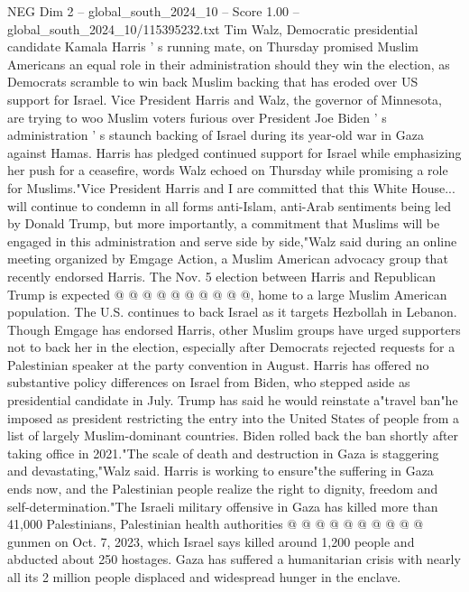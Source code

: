 \begin{textsample}{NEG Dim 2 – global\_south\_2024\_10 – Score 1.00 – global\_south\_2024\_10/115395232.txt}  \label{ex:f2_neg_416}
Tim Walz, Democratic presidential candidate Kamala Harris ' s running mate, on Thursday promised Muslim Americans an equal role in their administration should they win the election, as Democrats scramble to win back Muslim backing that has eroded over US support for Israel.
Vice President Harris and Walz, the governor of Minnesota, are trying to woo Muslim voters furious over President Joe Biden ' s administration ' s staunch backing of Israel during its year-old war in Gaza against Hamas.
Harris has pledged continued support for Israel while emphasizing her push for a ceasefire, words Walz echoed on Thursday while promising a role for Muslims."Vice President Harris and I are committed that this White House... will continue to condemn in all forms anti-Islam, anti-Arab sentiments being led by Donald Trump, but more importantly, a commitment that Muslims will be engaged in this administration and serve side by side,"Walz said during an online meeting organized by Emgage Action, a Muslim American advocacy group that recently endorsed Harris.
The Nov. 5 election between Harris and Republican Trump is expected @ @ @ @ @ @ @ @ @ @, home to a large Muslim American population.
The U.S. continues to back Israel as it targets Hezbollah in Lebanon.
Though Emgage has endorsed Harris, other Muslim groups have urged supporters not to back her in the election, especially after Democrats rejected requests for a Palestinian speaker at the party convention in August.
Harris has offered no substantive policy differences on Israel from Biden, who stepped aside as presidential candidate in July.
Trump has said he would reinstate a"travel ban"he imposed as president restricting the entry into the United States of people from a list of largely Muslim-dominant countries.
Biden rolled back the ban shortly after taking office in 2021."The scale of death and destruction in Gaza is staggering and devastating,"Walz said.
Harris is working to ensure"the suffering in Gaza ends now, and the Palestinian people realize the right to dignity, freedom and self-determination."The Israeli military offensive in Gaza has killed more than 41,000 Palestinians, Palestinian health authorities @ @ @ @ @ @ @ @ @ @ gunmen on Oct. 7, 2023, which Israel says killed around 1,200 people and abducted about 250 hostages.
Gaza has suffered a humanitarian crisis with nearly all its 2 million people displaced and widespread hunger in the enclave.

\end{textsample}
